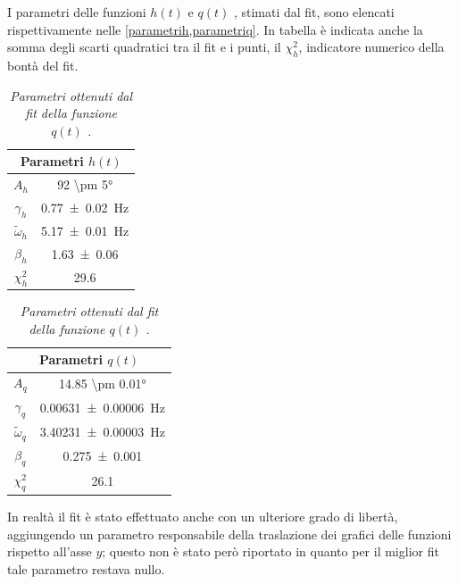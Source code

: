\documentclass[11pt, a4paper, twoside, italian]{article}
\begin{document}
I parametri delle funzioni $h(t)$  e $q(t)$ , stimati dal fit, sono elencati rispettivamente 
nelle \cref{parametrih,parametriq}.
In tabella è indicata anche la somma degli scarti quadratici tra il fit e i punti, il
$\chi^2_h$, indicatore numerico della bontà del fit.
\begin{table}[h!]
  \centering
\begin{minipage}{0.45\linewidth}
  \centering
  \begin{tabular}{cc}
      \toprule
      \multicolumn{2}{c}{Parametri $h(t)$} \\ 
      \midrule
      $A_h$     & \ang{92 \pm 5} \\
      $\gamma_h$& \SI{0.77 \pm 0.02}{\hertz} \\
      $\tilde{\omega}_h$& \SI{5.17 \pm 0.01}{\hertz}\\
      $\beta_h$   &  \SI{1.63 \pm 0.06}{}  \\
      $\chi^2_h$   &  \SI{29.6}{}  \\
      \midrule
    \end{tabular}
  \caption{\textit{Parametri ottenuti dal fit della funzione $h(t)$ .}}
  \label{parametrih}
\end{minipage}
\begin{minipage}{0.45\linewidth}
  \centering
    \begin{tabular}{cc}
        \toprule
        \multicolumn{2}{c}{Parametri $q(t)$} \\ 
        \midrule
        $A_q$     & \ang{14.85 \pm 0.01} \\
        $\gamma_q$& \SI{0.00631 \pm 0.00006}{\hertz} \\
        $\tilde{\omega}_q$& \SI{3.40231 \pm 0.00003}{\hertz}\\
        $\beta_q$   &  \SI{0.275 \pm 0.001}{}  \\
        $\chi^2_q$   &  \SI{26.1}{}  \\
        \midrule
      \end{tabular}
    \caption{\textit{Parametri ottenuti dal fit della funzione $q(t)$ .}}
    \label{parametriq}
\end{minipage}
\end{table}
In realtà il fit è stato effettuato anche con un ulteriore grado di libertà, aggiungendo
un parametro responsabile della traslazione dei grafici delle funzioni rispetto 
all'asse $y$; questo non è stato però riportato in quanto per il miglior fit
tale parametro restava nullo.
\end{document}

